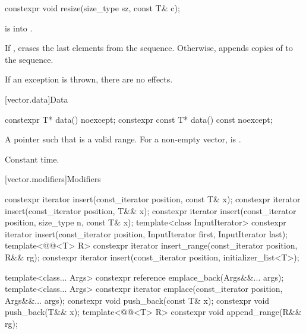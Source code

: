 %
\begin{itemdecl}
constexpr void resize(size_type sz, const T& c);
\end{itemdecl}

\begin{itemdescr}
\pnum
\expects
{} is
 into .

\pnum
\effects
If , erases the last  elements
from the sequence. Otherwise,
appends  copies of  to the sequence.

\pnum
\remarks
If an exception is thrown, there are no effects.
\end{itemdescr}

[vector.data]{Data}

%
\begin{itemdecl}
constexpr T*       data() noexcept;
constexpr const T* data() const noexcept;
\end{itemdecl}

\begin{itemdescr}
\pnum
\returns
A pointer such that  is a valid range. For a
non-empty vector,  is .

\pnum
\complexity
Constant time.
\end{itemdescr}

[vector.modifiers]{Modifiers}

%
\begin{itemdecl}
constexpr iterator insert(const_iterator position, const T& x);
constexpr iterator insert(const_iterator position, T&& x);
constexpr iterator insert(const_iterator position, size_type n, const T& x);
template<class InputIterator>
  constexpr iterator insert(const_iterator position, InputIterator first, InputIterator last);
template<@@<T> R>
  constexpr iterator insert_range(const_iterator position, R&& rg);
constexpr iterator insert(const_iterator position, initializer_list<T>);

template<class... Args> constexpr reference emplace_back(Args&&... args);
template<class... Args> constexpr iterator emplace(const_iterator position, Args&&... args);
constexpr void push_back(const T& x);
constexpr void push_back(T&& x);
template<@@<T> R>
  constexpr void append_range(R&& rg);
\end{itemdecl}

